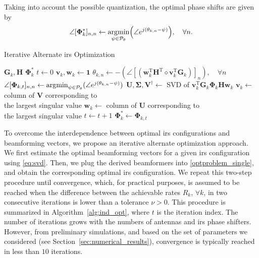 Taking into account the possible quantization, the optimal phase shifts are given by
\begin{equation}
    \angle[\bm{\Phi}^*_k]_{n,n} \leftarrow
    \argmin_{\substack{\psi \in \mathcal{P}_{\theta}}}\left(\angle e^{j(\theta_{k, n}-\psi)}\right), \quad \forall n.
\end{equation}

\begin{algorithm}[t]%
\caption{Iterative Alternate \gls{irs} Optimization}\label{alg:ind_opt}
\begin{algorithmic}[1]%
\Require $\bm{G}_k, \bm{H}$
\Ensure $\bm{\Phi}^*_k$
\State $t\gets 0$
\State $\bm{v}_k, \bm{w}_k \gets \bm{1}$
\Repeat
\State$	\theta_{k, n} \gets -(\angle\left[\left(\bm{w}_k^{\mathrm T}\bm{H}^{\mathrm T}\diamond\bm{v}_k^{\mathrm T}\bm{G}_k\right)\right]_{n}), \quad \forall n$
\State$\angle[\bm{\Phi}_{k, t}]_{n,n} \gets \operatorname*{\arg\!\min}_{\substack{\psi \in \mathcal{P}_{\theta}}}(\angle e^{j(\theta_{k, n}-\psi)})$
\State$\bm{U}, \bm{\Sigma}, \bm{V}^\dagger \gets$  SVD of $\bm{v}_k^{\mathrm T}\bm{G}_k \bm{\Phi}_k \bm{H}\bm{w}_k $
\State$\bm{v}_k \gets$ column of $\bm{V}$ corresponding to \\\quad\quad the largest singular value
\State$\bm{w}_k \gets$ column of $\bm{U}$ corresponding to \\\quad\quad the largest singular value
\State$t \gets t+1$
\State $\bm{\Phi}^*_k \gets \bm{\Phi}_{k,t}$
\end{algorithmic}\normalsize
\end{algorithm}

To overcome the interdependence between optimal \gls{irs} configurations and beamforming vectors, we propose an iterative alternate optimization approach. We first estimate the optimal beamforming vectors for a given \gls{irs} configuration using \eqref{eq:svd}. Then, we plug the derived beamformers into \eqref{optproblem_single}, and obtain the corresponding optimal \gls{irs} configuration. We repeat this two-step procedure until convergence, which, for practical purposes, is assumed to be reached when the difference between the achievable rates $R_k$, $\forall k$, in two consecutive iterations is lower than a tolerance $\nu>0$. 
This procedure is summarized in Algorithm~\ref{alg:ind_opt}, where $t$ is the iteration index. The number of iterations grows with the numbers of antennas and \gls{irs} phase shifters. However, from preliminary simulations, and based on the set of parameters we considered (see Section~\ref{sec:numerical_results}), convergence is typically reached in less than $10$ iterations.


